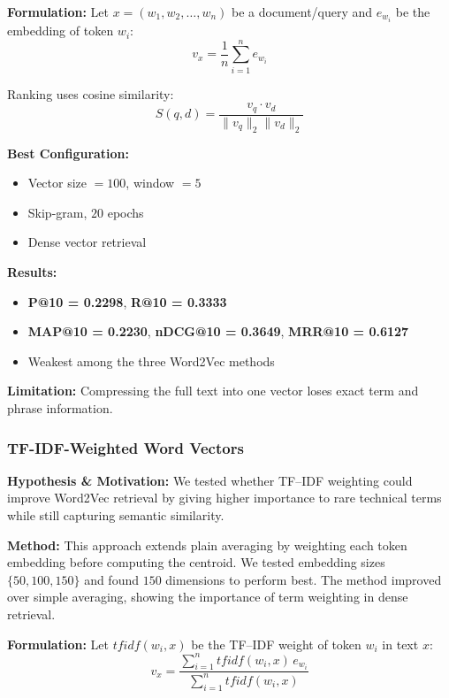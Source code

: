 \documentclass[runningheads]{llncs}
\begin{document}
\textbf{Formulation:}  
Let $x = (w_1, w_2, \dots, w_n)$ be a document/query and $e_{w_i}$ be the embedding of token $w_i$:
\begin{equation}
v_x = \frac{1}{n}\sum_{i=1}^{n} e_{w_i}
\end{equation}

Ranking uses cosine similarity:
\begin{equation}
S(q,d) = \frac{v_q \cdot v_d}{\|v_q\|_2 \|v_d\|_2}
\end{equation}

\textbf{Best Configuration:}
\begin{itemize}[noitemsep]
    \item Vector size $=100$, window $=5$
    \item Skip-gram, $20$ epochs
    \item Dense vector retrieval
\end{itemize}

\textbf{Results:}
\begin{itemize}[noitemsep]
    \item \textbf{P@10 = 0.2298}, \textbf{R@10 = 0.3333}
    \item \textbf{MAP@10 = 0.2230}, \textbf{nDCG@10 = 0.3649}, \textbf{MRR@10 = 0.6127}
    \item Weakest among the three Word2Vec methods
\end{itemize}

\textbf{Limitation:}  
Compressing the full text into one vector loses exact term and phrase information.

\subsubsection{TF-IDF-Weighted Word Vectors}

\textbf{Hypothesis \& Motivation:}  
We tested whether TF--IDF weighting could improve Word2Vec retrieval by giving higher importance to rare technical terms while still capturing semantic similarity.

\textbf{Method:}  
This approach extends plain averaging by weighting each token embedding before computing the centroid. We tested embedding sizes $\{50,100,150\}$ and found $150$ dimensions to perform best. The method improved over simple averaging, showing the importance of term weighting in dense retrieval.

\textbf{Formulation:}  
Let $tfidf(w_i, x)$ be the TF--IDF weight of token $w_i$ in text $x$:
\begin{equation}
v_x = \frac{\sum_{i=1}^{n} tfidf(w_i, x)\, e_{w_i}}{\sum_{i=1}^{n} tfidf(w_i, x)}
\end{equation}
\end{document}
